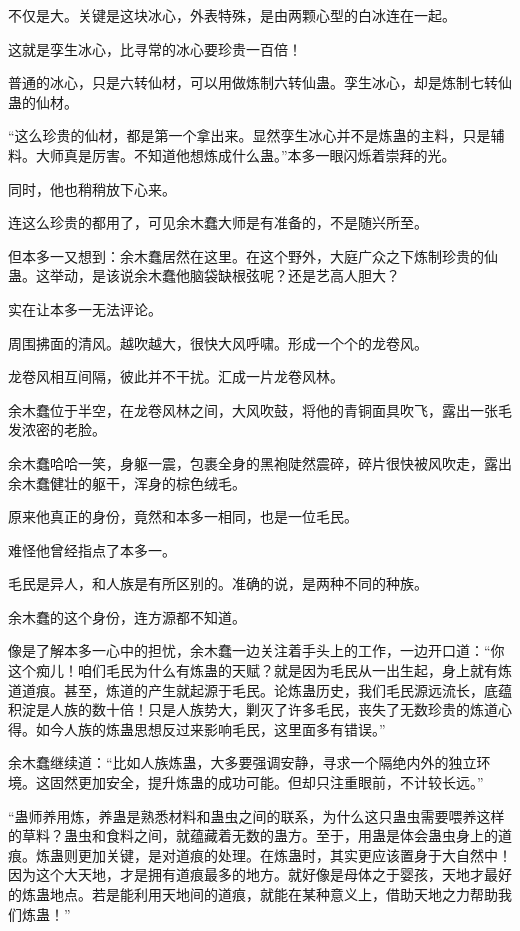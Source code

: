 \begin{this_body}
不仅是大。关键是这块冰心，外表特殊，是由两颗心型的白冰连在一起。

这就是孪生冰心，比寻常的冰心要珍贵一百倍！

普通的冰心，只是六转仙材，可以用做炼制六转仙蛊。孪生冰心，却是炼制七转仙蛊的仙材。

“这么珍贵的仙材，都是第一个拿出来。显然孪生冰心并不是炼蛊的主料，只是辅料。大师真是厉害。不知道他想炼成什么蛊。”本多一眼闪烁着崇拜的光。

同时，他也稍稍放下心来。

连这么珍贵的都用了，可见余木蠢大师是有准备的，不是随兴所至。

但本多一又想到：余木蠢居然在这里。在这个野外，大庭广众之下炼制珍贵的仙蛊。这举动，是该说余木蠢他脑袋缺根弦呢？还是艺高人胆大？

实在让本多一无法评论。

周围拂面的清风。越吹越大，很快大风呼啸。形成一个个的龙卷风。

龙卷风相互间隔，彼此并不干扰。汇成一片龙卷风林。

余木蠢位于半空，在龙卷风林之间，大风吹鼓，将他的青铜面具吹飞，露出一张毛发浓密的老脸。

余木蠢哈哈一笑，身躯一震，包裹全身的黑袍陡然震碎，碎片很快被风吹走，露出余木蠢健壮的躯干，浑身的棕色绒毛。

原来他真正的身份，竟然和本多一相同，也是一位毛民。

难怪他曾经指点了本多一。

毛民是异人，和人族是有所区别的。准确的说，是两种不同的种族。

余木蠢的这个身份，连方源都不知道。

像是了解本多一心中的担忧，余木蠢一边关注着手头上的工作，一边开口道：“你这个痴儿！咱们毛民为什么有炼蛊的天赋？就是因为毛民从一出生起，身上就有炼道道痕。甚至，炼道的产生就起源于毛民。论炼蛊历史，我们毛民源远流长，底蕴积淀是人族的数十倍！只是人族势大，剿灭了许多毛民，丧失了无数珍贵的炼道心得。如今人族的炼蛊思想反过来影响毛民，这里面多有错误。”

余木蠢继续道：“比如人族炼蛊，大多要强调安静，寻求一个隔绝内外的独立环境。这固然更加安全，提升炼蛊的成功可能。但却只注重眼前，不计较长远。”

“蛊师养用炼，养蛊是熟悉材料和蛊虫之间的联系，为什么这只蛊虫需要喂养这样的草料？蛊虫和食料之间，就蕴藏着无数的蛊方。至于，用蛊是体会蛊虫身上的道痕。炼蛊则更加关键，是对道痕的处理。在炼蛊时，其实更应该置身于大自然中！因为这个大天地，才是拥有道痕最多的地方。就好像是母体之于婴孩，天地才最好的炼蛊地点。若是能利用天地间的道痕，就能在某种意义上，借助天地之力帮助我们炼蛊！”


\end{this_body}
